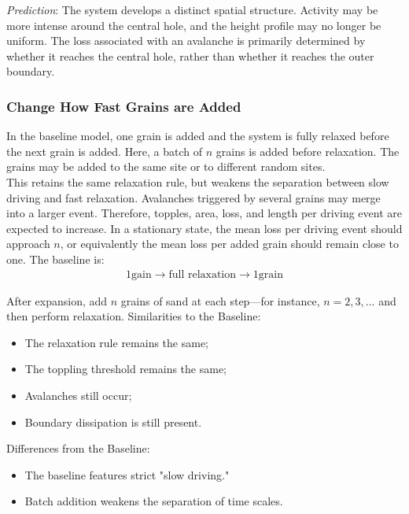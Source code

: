 \documentclass{article}
\begin{document}
\textit{Prediction}: The system develops a distinct spatial structure. Activity may be more intense around the central hole, and the height profile may no longer be uniform. The loss associated with an avalanche is primarily determined by whether it reaches the central hole, rather than whether it reaches the outer boundary.


\clearpage

\subsubsection{Change How Fast Grains are Added}

In the baseline model, one grain is added and the system is fully relaxed before the next grain is added. Here, a batch of \(n\) grains is added before relaxation. The grains may be added to the same site or to different random sites.\\

This retains the same relaxation rule, but weakens the separation between slow driving and fast relaxation. Avalanches triggered by several grains may merge into a larger event. Therefore, topples, area, loss, and length per driving event are expected to increase. In a stationary state, the mean loss per driving event should approach \(n\), or equivalently the mean loss per added grain should remain close to one. The baseline is:
\begin{align*}
    1 \mbox{gain} \rightarrow \mbox{full relaxation} \rightarrow 1 \mbox{grain}
\end{align*}

After expansion, add $n$ grains of sand at each step—for instance, $n = 2, 3, ...$ and then perform relaxation. Similarities to the Baseline:

\begin{itemize}
    \item The relaxation rule remains the same;
    \item The toppling threshold remains the same;
    \item Avalanches still occur;
    \item Boundary dissipation is still present.
\end{itemize}

Differences from the Baseline:
\begin{itemize}
    \item The baseline features strict "slow driving."
    \item Batch addition weakens the separation of time scales.
\end{itemize}
\end{document}
